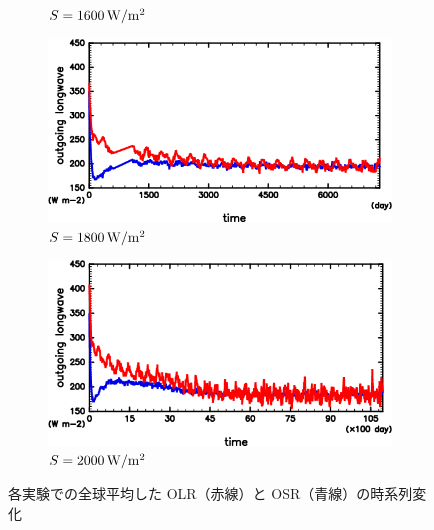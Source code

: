 \documentclass[body]{subfiles}
\begin{document}
\begin{figure}[t]
\begin{subfigure}{.4\textwidth}
		\caption{\(S=1600\hmu{W/m^2}\)}\label{S1600_OLRA}
	\end{subfigure}
	\begin{subfigure}{.4\textwidth}
		\centering
		\includegraphics[width=\columnwidth]{S1800/S1800_OLRA-OSRA_horimean_time0.0-7300.0-crop.png}
		\caption{\(S=1800\hmu{W/m^2}\)}\label{S1800_OLRA}
	\end{subfigure}
	\begin{subfigure}{.4\textwidth}
		\centering
		\includegraphics[width=\columnwidth]{S2000/S2000_OLRA-OSRA_horimean_time0.0-10950.0-crop.png}
		\caption{\(S=2000\hmu{W/m^2}\)}\label{S2000_OLRA}
	\end{subfigure}
	\caption{各実験での全球平均した OLR（赤線）と OSR（青線）の時系列変化}\label{OLR-OSR}
\end{figure}
\end{document}
